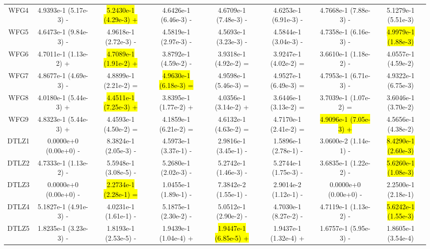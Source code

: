 \documentclass[journal]{IEEEtran}
\begin{document}
\begin{table}[tbp]
{\begin{tabular}{cccccccc}
      WFG4    & 4.9393e-1 (5.17e-3) -      & \hl{5.2430e-1 (4.29e-3) +} & 4.6426e-1 (6.46e-3) -      & 4.6709e-1 (7.48e-3) -      & 4.6253e-1 (6.91e-3) -      & 4.7668e-1 (7.88e-3) -      & 5.1279e-1 (5.51e-3)      \\
      WFG5    & 4.6473e-1 (9.84e-3) -      & 4.9618e-1 (2.72e-3) -      & 4.5819e-1 (2.97e-3) -      & 4.5693e-1 (3.23e-3) -      & 4.5844e-1 (3.04e-3) -      & 4.7358e-1 (6.16e-3) -      & \hl{4.9979e-1 (1.88e-3)} \\
      WFG6    & 4.7011e-1 (1.13e-2) +      & \hl{4.7089e-1 (1.91e-2) +} & 3.8792e-1 (4.59e-2) -      & 3.9318e-1 (4.92e-2) =      & 3.9247e-1 (4.02e-2) =      & 3.6610e-1 (1.18e-2) -      & 4.0557e-1 (4.59e-2)      \\
      WFG7    & 4.8677e-1 (4.69e-3) -      & 4.8899e-1 (2.21e-2) =      & \hl{4.9630e-1 (6.18e-3) =} & 4.9598e-1 (5.46e-3) =      & 4.9527e-1 (6.49e-3) =      & 4.7953e-1 (6.71e-3) -      & 4.9322e-1 (6.75e-3)      \\
      WFG8    & 4.0180e-1 (5.44e-3) +      & \hl{4.4511e-1 (7.25e-3) +} & 3.8395e-1 (1.77e-2) +      & 4.0356e-1 (3.14e-2) +      & 3.6446e-1 (3.13e-2) =      & 3.7039e-1 (1.07e-2) =      & 3.6046e-1 (3.70e-2)      \\
      WFG9    & 4.8323e-1 (5.44e-3) +      & 4.4593e-1 (4.50e-2) =      & 4.1859e-1 (6.21e-2) =      & 4.6132e-1 (4.63e-2) =      & 4.7170e-1 (2.41e-2) =      & \hl{4.9096e-1 (7.05e-3) +} & 4.5656e-1 (4.38e-2)      \\
      \hline
      DTLZ1   & 0.0000e+0 (0.00e+0) -      & 8.3824e-1 (2.05e-3) -      & 4.5973e-1 (3.37e-1) -      & 2.9816e-1 (3.45e-1) -      & 1.5896e-1 (2.78e-1) -      & 3.0600e-2 (1.14e-1) -      & \hl{8.4290e-1 (2.60e-3)} \\
      DTLZ2   & 4.7333e-1 (1.13e-2) -      & 5.5948e-1 (3.08e-5) -      & 5.2680e-1 (2.02e-3) -      & 5.2742e-1 (1.46e-3) -      & 5.2744e-1 (1.75e-3) -      & 3.6835e-1 (1.22e-2) -      & \hl{5.6260e-1 (1.08e-3)} \\
      DTLZ3   & 0.0000e+0 (0.00e+0) -      & \hl{2.2734e-1 (2.28e-1) =} & 1.0455e-1 (1.89e-1) -      & 7.3842e-2 (1.55e-1) -      & 2.9014e-2 (1.12e-1) -      & 0.0000e+0 (0.00e+0) -      & 2.2500e-1 (2.18e-1)      \\
      DTLZ4   & 5.1827e-1 (4.91e-3) -      & 4.0231e-1 (1.61e-1) -      & 5.1875e-1 (2.30e-2) -      & 5.0512e-1 (2.90e-2) -      & 4.7030e-1 (8.27e-2) -      & 4.7119e-1 (1.13e-2) -      & \hl{5.6242e-1 (1.55e-3)} \\
      DTLZ5   & 1.8235e-1 (3.23e-3) -      & 1.8193e-1 (2.53e-5) -      & 1.9439e-1 (1.04e-4) +      & \hl{1.9447e-1 (6.85e-5) +} & 1.9437e-1 (1.32e-4) +      & 1.6757e-1 (5.95e-3) -      & 1.8605e-1 (3.54e-4)      \\

\end{tabular}}
\end{table}
\end{document}
